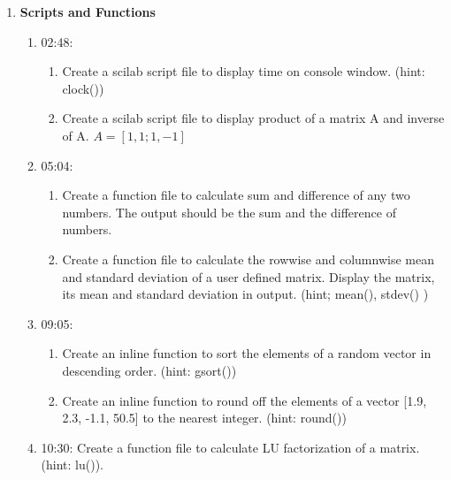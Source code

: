 \documentclass[12pt,a4paper]{article}
\newenvironment{enumcpt}{\begin{enumerate} \topsep -3mm \partopsep -3mm 
                        \parsep -3mm
                        \itemsep -0mm \leftmargin -1in \rightmargin -3mm
                        }{\end{enumerate}}
\begin{document}
\begin{multicols}{2}
\begin{enumcpt}
\item {\bf Scripts and Functions}
\begin{enumcpt}
\item 02:48: 
	\begin{enumcpt}
	\item Create a scilab script file to display time on console window. (hint: clock())
	\item Create a scilab script file to display product of a matrix A and inverse of A. $A =[1, 1;1, -1]$
	\end{enumcpt}
\item 05:04:
	\begin{enumcpt}
	\item Create a function file to calculate sum and difference of any two numbers. The output should be the sum and the difference of numbers.
	\item Create a function file to calculate the rowwise and columnwise mean and standard deviation of a user defined matrix. Display the matrix, its mean and standard deviation in output. (hint; mean(), stdev() )
	\end{enumcpt}
\item 09:05:
	\begin{enumcpt}
	\item Create an inline function to sort the elements of a random vector in descending order. (hint: gsort())
	\item Create an inline function to round off the elements of
    a vector [1.9, 2.3, -1.1, 50.5] to the nearest integer. (hint: round())
	\end{enumcpt}
\item 10:30: Create a function file to calculate LU factorization of a matrix. (hint: lu()).
	\end{enumcpt}



\end{enumcpt}
\end{multicols}
\end{document}
